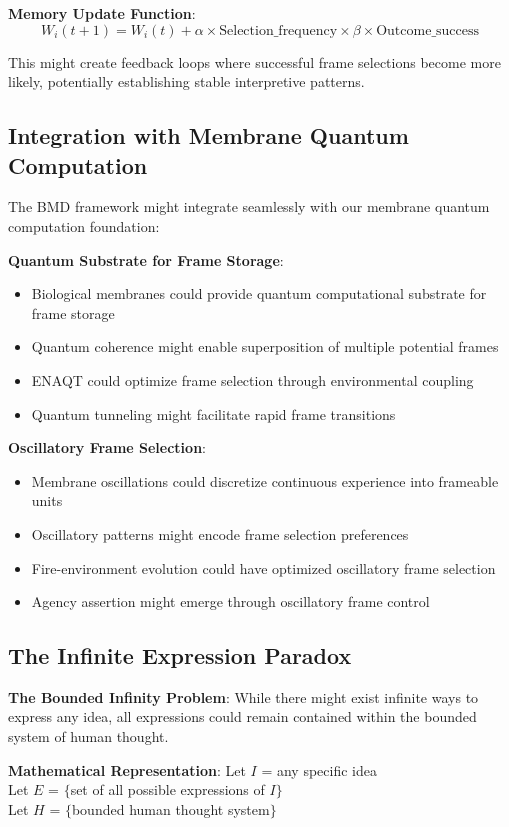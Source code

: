 \documentclass[12pt]{article}
\begin{document}
\textbf{Memory Update Function}:
$$W_i(t+1) = W_i(t) + \alpha \times \text{Selection\_frequency} \times \beta \times \text{Outcome\_success}$$

This might create feedback loops where successful frame selections become more likely, potentially establishing stable interpretive patterns.

\subsection{Integration with Membrane Quantum Computation}

The BMD framework might integrate seamlessly with our membrane quantum computation foundation:

\textbf{Quantum Substrate for Frame Storage}:
\begin{itemize}
\item Biological membranes could provide quantum computational substrate for frame storage
\item Quantum coherence might enable superposition of multiple potential frames
\item ENAQT could optimize frame selection through environmental coupling
\item Quantum tunneling might facilitate rapid frame transitions
\end{itemize}

\textbf{Oscillatory Frame Selection}:
\begin{itemize}
\item Membrane oscillations could discretize continuous experience into frameable units
\item Oscillatory patterns might encode frame selection preferences
\item Fire-environment evolution could have optimized oscillatory frame selection
\item Agency assertion might emerge through oscillatory frame control
\end{itemize}

\subsection{The Infinite Expression Paradox}

\textbf{The Bounded Infinity Problem}: While there might exist infinite ways to express any idea, all expressions could remain contained within the bounded system of human thought.

\textbf{Mathematical Representation}:
Let $I$ = any specific idea \\
Let $E$ = $\{$set of all possible expressions of $I\}$ \\
Let $H$ = $\{$bounded human thought system$\}$
\end{document}
